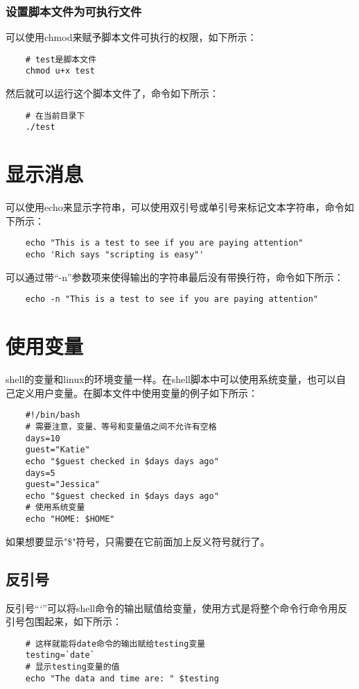 \documentclass[a4paper,left=2.5cm,right=2.5cm,11pt]{article}
\begin{document}
\subsubsection{设置脚本文件为可执行文件}
	可以使用chmod来赋予脚本文件可执行的权限，如下所示：
	\begin{lstlisting}
	# test是脚本文件
	chmod u+x test
	\end{lstlisting}

	然后就可以运行这个脚本文件了，命令如下所示：
	\begin{lstlisting}
	# 在当前目录下
	./test
	\end{lstlisting}

\section{显示消息}
	可以使用echo来显示字符串，可以使用双引号或单引号来标记文本字符串，命令如下所示：
	\begin{lstlisting}
	echo "This is a test to see if you are paying attention"
	echo 'Rich says "scripting is easy"'
	\end{lstlisting}

	可以通过带“-n”参数项来使得输出的字符串最后没有带换行符，命令如下所示：
	\begin{lstlisting}
	echo -n "This is a test to see if you are paying attention"
	\end{lstlisting}

\section{使用变量}
	shell的变量和linux的环境变量一样。在shell脚本中可以使用系统变量，也可以自己定义用户变量。在脚本文件中使用变量的例子如下所示：
	\begin{lstlisting}
	#!/bin/bash
	# 需要注意，变量、等号和变量值之间不允许有空格
	days=10
	guest="Katie"
	echo "$guest checked in $days days ago"
	days=5
	guest="Jessica"
	echo "$guest checked in $days days ago"
	# 使用系统变量
	echo "HOME: $HOME"
	\end{lstlisting}

	如果想要显示"\$"符号，只需要在它前面加上反义符号就行了。

\subsection{反引号}
	反引号“`”可以将shell命令的输出赋值给变量，使用方式是将整个命令行命令用反引号包围起来，如下所示：
	\begin{lstlisting}
	# 这样就能将date命令的输出赋给testing变量
	testing=`date`
	# 显示testing变量的值
	echo "The data and time are: " $testing
	\end{lstlisting}
\end{document}
